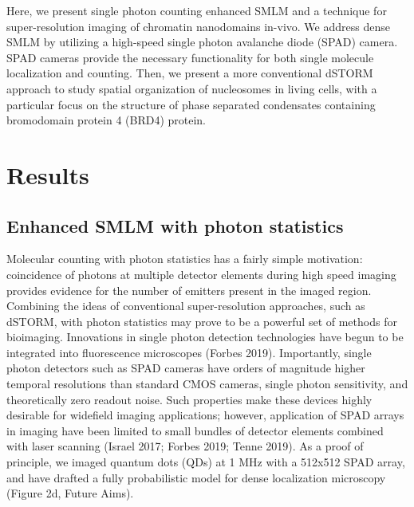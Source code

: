 \documentclass{ucetd}
\begin{document}
Here, we present single photon counting enhanced SMLM and a technique for super-resolution imaging of chromatin nanodomains in-vivo. We address dense SMLM by utilizing a high-speed single photon avalanche diode (SPAD) camera. SPAD cameras provide the necessary functionality for both single molecule localization and counting. Then, we present a more conventional dSTORM approach to study spatial organization of nucleosomes in living cells, with a particular focus on the structure of phase separated condensates containing bromodomain protein 4 (BRD4) protein.


\section{Results}

\subsection{Enhanced SMLM with photon statistics}

Molecular counting with photon statistics has a fairly simple motivation: coincidence of photons at multiple detector elements during high speed imaging provides evidence for the number of emitters present in the imaged region. Combining the ideas of conventional super-resolution approaches, such as dSTORM, with photon statistics may prove to be a powerful set of methods for bioimaging. Innovations in single photon detection technologies have begun to be integrated into fluorescence microscopes (Forbes 2019). Importantly, single photon detectors such as SPAD cameras have orders of magnitude higher temporal resolutions than standard CMOS cameras, single photon sensitivity, and theoretically zero readout noise. Such properties make these devices highly desirable for widefield imaging applications; however, application of SPAD arrays in imaging have been limited to small bundles of detector elements combined with laser scanning (Israel 2017; Forbes 2019; Tenne 2019). As a proof of principle, we imaged quantum dots (QDs) at 1 MHz with a 512x512 SPAD array, and have drafted a fully probabilistic model for dense localization microscopy (Figure 2d, Future Aims). 
\end{document}
